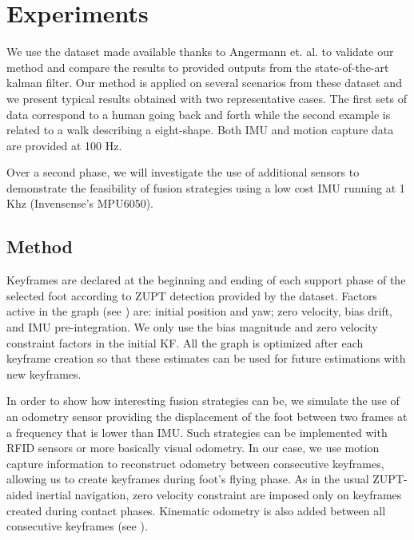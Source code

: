 
\section{Experiments} \label{sec:experiments}

We use the dataset made available thanks to Angermann et. al. \cite{angermann2010high} to validate our method and compare the results to provided outputs from the state-of-the-art kalman filter.
Our method is applied on several scenarios from these dataset and we present typical results obtained with two representative cases. The first sets of data correspond to a human going back and forth 
while the second example is related to a walk describing a eight-shape. Both IMU and motion capture data are provided at 100 Hz.

Over a second phase, we will investigate the use of additional sensors to demonstrate the feasibility of fusion strategies using a low cost IMU running at 1 Khz (Invensense's MPU6050).

\subsection{Method}

Keyframes are declared at the beginning and ending of each support phase of the selected foot according to ZUPT detection provided by the dataset. Factors active in the graph (see ) are: initial position and yaw; zero velocity, bias drift, and IMU pre-integration. We only use the bias magnitude 
and zero velocity constraint factors in the initial KF. All the graph is optimized after each keyframe creation so that these estimates can be used for future estimations with new keyframes.

In order to show how interesting fusion strategies can be, we simulate the use of an odometry sensor providing the displacement of the foot between two frames at a frequency that is lower than IMU. Such strategies can be implemented with
RFID sensors or more basically visual odometry. In our case, we use motion capture information to reconstruct odometry between consecutive keyframes, allowing us to create keyframes during foot's flying phase. As in the usual ZUPT-aided inertial
navigation, zero velocity constraint are imposed only on keyframes created during contact phases. Kinematic odometry is also added between all consecutive keyframes (see ).

